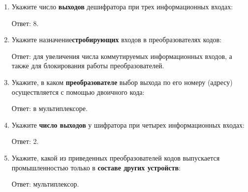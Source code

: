 \documentclass[spec, och, labwork]{shiza}
\begin{document}
\begin{enumerate}
        \item Укажите число \textbf{выходов} дешифратора при трех информационных входах:

        Ответ: 8.
        
        \item Укажите назначение\textbf{стробирующих} входов в преобразователях кодов: 

        Ответ: для увеличения числа коммутируемых информационных входов, а также
        для блокирования работы преобразователей.

        \item Укажите, в каком \textbf{преобразователе} выбор выхода по его номеру (адресу)
        осуществляется с помощью двоичного кода:

        Ответ: в мультиплексоре.
        
        \item Укажите \textbf{число выходов} у шифратора при четырех информационных
        входах:

        Ответ: 2.
        
        \item Укажите, какой из приведенных преобразователей кодов выпускается промышленностью
        только в \textbf{составе других устройств}:

        Ответ: мультиплексор.

\end{enumerate}
\end{document}
